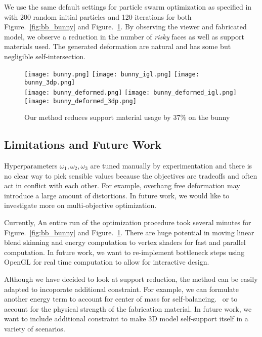 We use the same default settings for particle swarm optimization as specified in \cite{jacobson_matryoshka_2017} with 200 random initial particles and 120 iterations for both Figure.~\ref{fig:bb_bunny} and Figure.~\ref{fig:bunny}. By observing the viewer and fabricated model, we observe a reduction in the number of \textit{risky} faces as well as support materials used. The generated deformation are natural and has some but negligible self-intersection.

\begin{figure}[ht]
    \centering
    \texttt{[image: bunny.png]}
    \texttt{[image: bunny\_igl.png]} 
    \texttt{[image: bunny\_3dp.png]}
    \\
    \texttt{[image: bunny\_deformed.png]} 
    \texttt{[image: bunny\_deformed\_igl.png]} 
    \texttt{[image: bunny\_deformed\_3dp.png]}
    \caption{Our method reduces support material usage by 37\% on the bunny}
    \label{fig:bunny}
\end{figure}


\subsection*{Limitations and Future Work}

Hyperparameters $\omega_1, \omega_2, \omega_3$ are tuned manually by experimentation and there is no clear way to pick sensible values because the objectives are tradeoffs and often act in conflict with each other. For example, overhang free deformation may introduce a large amount of distortions. In future work, we would like to investigate more on multi-objective optimization.

Currently, An entire run of the optimization procedure took several minutes for Figure.~\ref{fig:bb_bunny} and Figure.~\ref{fig:bunny}. There are huge potential in moving linear blend skinning and energy computation to vertex shaders for fast and parallel computation. In future work, we want to re-implement bottleneck steps using OpenGL for real time computation to allow for interactive design.

Although we have decided to look at support reduction, the method can be easily adapted to incoporate additional constraint. For example, we can formulate another energy term to account for center of mass for self-balancing.~\cite{make_it_stand_2013} or to account for the physical strength of the fabrication material. In future work, we want to include additional constraint to make 3D model self-support itself in a variety of scenarios.